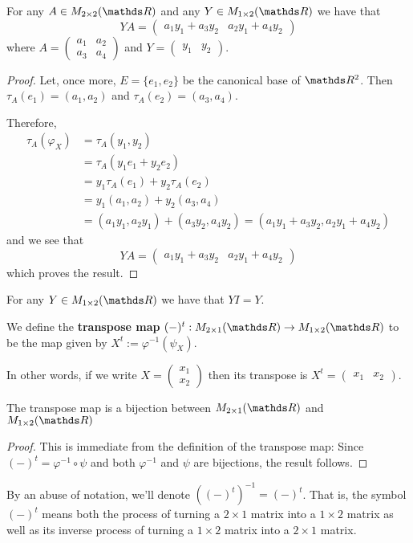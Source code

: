 \begin{lemma}
	For any $A\in M_{2\times 2}(\R)$ and any $Y\in M_{1\times 2}(\R)$ we have that \[YA=\begin{pmatrix}
	a_1y_1+a_3y_2&
	a_2y_1+a_4y_2
	\end{pmatrix}\]where $A=\begin{pmatrix}
	a_1&a_2\\
	a_3&a_4
	\end{pmatrix}$ and $Y=\begin{pmatrix}
	y_1&y_2
	\end{pmatrix}$.
\end{lemma}
\begin{proof}
	Let, once more, $E=\{e_1,e_2\}$ be the canonical base of $\R^2$. Then $\tau_A(e_1)=(a_1,a_2)$ and $\tau_A(e_2)=(a_3,a_4)$.
	
	Therefore,
	\begin{align*}
	\tau_A(\varphi_X)&=\tau_A(y_1,y_2)\\
	&=\tau_A(y_1e_1+y_2e_2)\\
	&=y_1\tau_A(e_1)+y_2\tau_A(e_2)\\
	&=y_1(a_1,a_2)+y_2(a_3,a_4)\\
	&=(a_1y_1,a_2y_1)+(a_3y_2,a_4y_2)=(a_1y_1+a_3y_2,a_2y_1+a_4y_2)
	\end{align*}and we see that \[YA=\begin{pmatrix}
	a_1y_1+a_3y_2&
	a_2y_1+a_4y_2
	\end{pmatrix}\]which proves the result.
\end{proof}
\begin{cor}
	For any $Y\in M_{1\times 2}(\R)$ we have that $YI=Y$.
\end{cor}

\begin{df}
	We define the \textbf{transpose map} $(-)^t:M_{2\times 1}(\R)\to M_{1\times 2}(\R)$ to be the map given by $X^t:=\varphi^{-1}(\psi_X)$.
	
	In other words, if we write $X=\begin{pmatrix}
	x_1\\x_2
	\end{pmatrix}$ then its transpose is $X^t=\begin{pmatrix}
	x_1&x_2
	\end{pmatrix}$.
\end{df}
\begin{prop}
	The transpose map is a bijection between $M_{2\times 1}(\R)$ and $M_{1\times 2}(\R)$
\end{prop}
\begin{proof}
	This is immediate from the definition of the transpose map: Since $(-)^t=\varphi^{-1}\circ \psi$ and both $\varphi^{-1}$ and $\psi$ are bijections, the result follows.
\end{proof}
\begin{df}
	By an abuse of notation, we'll denote $((-)^t)^{-1}=(-)^t$. That is, the symbol $(-)^t$ means both the process of turning a $2\times 1$ matrix into a $1\times 2$ matrix as well as its inverse process of turning a $1\times 2$ matrix into a $2\times 1$ matrix.
\end{df}

